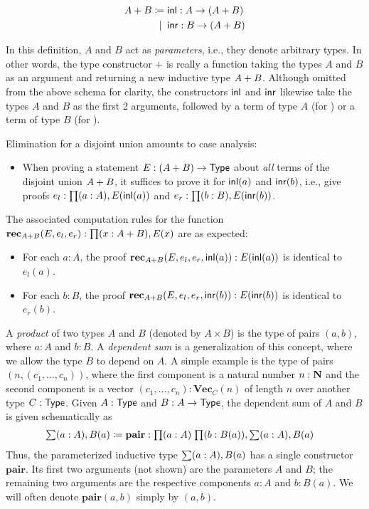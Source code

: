 \begin{align*}
  A + B \coloneqq \; & \mathsf{inl} : A \to (A + B) \\
         \;|\;\; & \mathsf{inr} : B \to (A + B)
\end{align*}

In this definition, $A$ and $B$ act as \emph{parameters}, i.e., they denote arbitrary types. In other words, the type constructor $+$ is really a function taking the types $A$ and $B$ as an argument and returning a new inductive type $A + B$. Although omitted from the above schema for clarity, the constructors $\mathsf{inl}$ and $\mathsf{inr}$ likewise take the types $A$ and $B$ as the first 2 arguments, followed by a term of type $A$ (for \inl) or a term of type $B$ (for \inr).

Elimination for a disjoint union amounts to case analysis:
\begin{itemize}
\item When proving a statement $E : (A + B) \to \mathsf{Type}$ about \emph{all} terms of the disjoint union $A + B$, it suffices to prove it for $\mathsf{inl}(a)$ and $\mathsf{inr}(b)$, i.e., give proofs $e_l : \prd{a:A} E(\inl(a))$ and $e_r : \prd{b:B} E(\inr(b))$.
\end{itemize}
The associated computation rules for the function $\rec_{\disj{A}{B}}(E,e_l,e_r) : \prd{x:\disj{A}{B}} E(x)$ are as expected:
\begin{itemize}
\item For each $a : A$, the proof $\mathbf{rec}_{A + B}(E,e_l,e_r,\mathsf{inl}(a)) : E(\mathsf{inl}(a))$ is identical to $e_l(a)$.
\item For each $b : B$, the proof $\mathbf{rec}_{A + B}(E,e_l,e_r,\mathsf{inr}(b)) : E(\mathsf{inr}(b))$ is identical to $e_r(b)$.
\end{itemize}

A \emph{product} of two types $A$ and $B$ (denoted by $A \times B$) is the type of pairs $(a,b)$, where $a : A$ and $b : B$. A \emph{dependent sum} is a generalization of this concept, where we allow the type $B$ to depend on $A$. A simple example is the type of pairs $(n,(c_1,\ldots,c_n))$, where the first component is a natural number $n : \mathbf{N}$ and the second component is a vector $(c_1,\ldots,c_n) : \mathbf{Vec}_C(n)$ of length $n$ over another type $C : \mathsf{Type}$.
Given $A : \mathsf{Type}$ and $B : A \to \mathsf{Type}$, the dependent sum of $A$ and $B$ is given schematically as
\begin{align*}
  \sm{a:A} B(a) \defeq \; & \mathbf{pair} : \prd{a:A}{b:B(a)} \sm{a:A} B(a)
\end{align*}
Thus, the parameterized inductive type $\sm{a:A} B(a)$ has a single constructor $\mathbf{pair}$. Its first two arguments (not shown) are the parameters $A$ and $B$; the remaining two arguments are the respective components $a : A$ and $b : B(a)$. We will often denote $\mathbf{pair}(a,b)$ simply by $(a,b)$.

